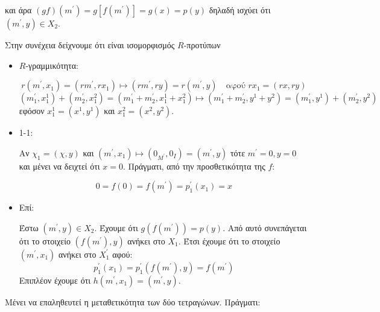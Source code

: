 \documentclass{article}
\begin{document}
\begin{enumerate}
και άρα $(gf)(m^{\prime}) = g[f(m^{\prime})] = g(x) = p(y)$ δηλαδή ισχύει ότι $(m^{\prime} , y) \in X_2$.

Στην συνέχεια δείχνουμε ότι είναι ισομορφισμός $R$-προτύπων

\begin{itemize}
	\item $R$-γραμμικότητα:

		$$r(m^{\prime}, x_1) = (rm^{\prime},rx_1) \mapsto (rm^{\prime} , ry) = r (m^{\prime}, y)\quad\text{αφού } rx_1= (rx,ry)$$
		$$(m^{\prime}_1, x^1_1) + (m^{\prime}_2, x^2_1) = (m^{\prime}_1 + m^{\prime}_2 , x^1_1 + x^2_1) \mapsto (m^{\prime}_1 + m^{\prime}_2 , y^1 + y^2) = (m^{\prime}_1, y^1) + (m^{\prime}_2, y^2) $$
		εφόσον $x^1_1 = (x^1, y^1) $ και $x^2_1 = (x^2 , y^2)$.
		$ $\newline
	
	\item 1-1:

		Αν $χ_1=(χ,y)$ και $(m^{\prime}, x_1) \mapsto (0_{M^{\prime}} , 0_I) = (m^{\prime}, y)$ τότε $m^{\prime} = 0, y = 0$ και μένει να δειχτεί ότι $x = 0$. Πράγματι, από την προσθετικότητα της $f$:

		$$0 = f(0) = f(m^{\prime}) = p^{\prime}_1 (x_1) = x$$
		$ $\newline

	\item Επί:

		Έστω $(m^{\prime},y) \in X_2$. Έχουμε ότι $g(f(m^{\prime})) = p(y)$. Από αυτό συνεπάγεται ότι το στοιχείο $(f(m^{\prime}), y)$ ανήκει στο $X_1$. Έτσι έχουμε ότι το στοιχείο $(m^{\prime} , x_1)$ ανήκει στο $X^{\prime}_1$ αφού:
		$$p^{\prime}_1 (x_1) = p^{\prime}_1 (f(m^{\prime}), y) = f(m^{\prime}) $$
		Επιπλέον έχουμε ότι $h(m^{\prime}, x_1) = (m^{\prime}, y)$.
\end{itemize}

Μένει να επαληθευτεί η μεταθετικότητα των δύο τετραγώνων. Πράγματι:

\begin{center}
\end{center}
$ $\newline


\end{enumerate}
\end{document}
